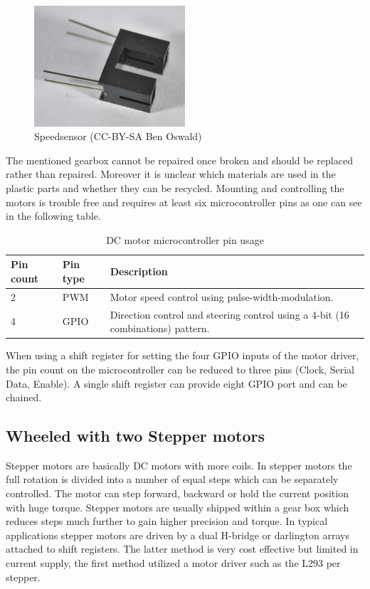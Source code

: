 \begin{figure}[H]
  \centering
  \includegraphics[width=0.5\textwidth]{images/30_speedsensor.jpg}
  \caption{Speedsensor (CC-BY-SA Ben Oswald)}
\end{figure}

The mentioned gearbox cannot be repaired once broken and should be replaced rather than repaired. Moreover it is unclear which materials are used in the plastic parts and whether they can be recycled. Mounting and controlling the motors is trouble free and requires at least six microcontroller pins as one can see in the following table.

\begin{table}[H]
\centering
\begin{tabular}{p{}p{}p{}}
\toprule
Pin count & Pin type & Description \\
\midrule
2 & PWM  & Motor speed control using pulse-width-modulation.\\
4 & GPIO & Direction control and steering control using a 4-bit (16 combinations) pattern.\\
\bottomrule
\end{tabular}
\caption{DC motor microcontroller pin usage}
\label{tbl:dc_pin}
\end{table}

When using a shift register for setting the four GPIO inputs of the motor driver, the pin count on the microcontroller can be reduced to three pins (Clock, Serial Data, Enable).  A single shift register can provide eight GPIO port and can be chained. 


\subsection{Wheeled with two Stepper motors}
Stepper motors are basically DC motors with more coils. In stepper motors the full rotation is divided into a number of equal steps which can be separately controlled. The motor can step forward, backward or hold the current position with huge torque. Stepper motors are usually shipped within a gear box which reduces steps much further to gain higher precision and torque. 
In typical applications stepper motors are driven by a dual H-bridge or darlington arrays attached to shift registers. The latter method is very cost effective but limited in current supply, the first method utilized a motor driver such as the L293 per stepper. \cite[pp. 289]{niku2001introduction}

